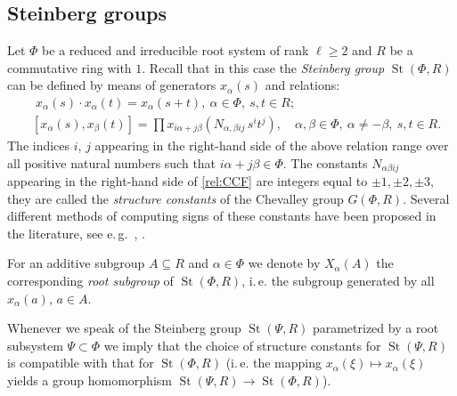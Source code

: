 \documentclass[oneside, 8pt]{amsart}
\theoremstyle{remark}
\theoremstyle{definition}
\numberwithin{lemma}{section}
\numberwithin{prop}{section}
\numberwithin{corollary}{section}
\numberwithin{externaltheorem}{section}
\DeclareMathOperator{\St}{St}
\numberwithin{equation}{section}
\begin{document}
\subsection{Steinberg groups} \label{sec:Steinberg-intro}
Let $\Phi$ be a reduced and irreducible root system of rank $\ell \geq 2$ and $R$ be a commutative ring with $1$. Recall that in this case the \emph{Steinberg group} $\St(\Phi, R)$ can be defined by means of generators $x_{\alpha}(s)$ and relations:
\begin{align}
& \phantom{[}
x_\alpha(s) \cdot x_\alpha(t) = x_\alpha(s+t),\ \alpha\in\Phi,\ s,t\in R; \label{rel:add}\\
& [x_\alpha(s), x_\beta(t)] = \prod
 x_{i\alpha + j\beta}\left(N_{\alpha,\beta ij}\, s^i t^j\right),\quad \alpha,\beta\in\Phi,\ \alpha\neq-\beta,\ s,t\in R. \label{rel:CCF}
\end{align}
The indices $i$, $j$ appearing in the right-hand side of the above relation range over
all positive natural numbers such that $i\alpha + j\beta\in\Phi$.
The constants $N_{\alpha \beta i j}$ appearing in the right-hand side of \eqref{rel:CCF} are integers equal to $\pm 1,\pm 2,\pm 3$, they are called the {\it structure constants} of the Chevalley group $G(\Phi, R)$. Several different methods of computing signs of these constants have been proposed in the literature, see e.\,g.~\cite{V00}, \cite[\S~9]{VP}. 

For an additive subgroup $A\subseteq R$ and $\alpha \in \Phi$ we denote by $X_\alpha(A)$ the corresponding {\it root subgroup} of $\St(\Phi, R)$, i.\,e. the subgroup generated by all $x_\alpha(a)$, $a \in A$.

Whenever we speak of the Steinberg group $\St(\Psi, R)$ parametrized by a root subsystem $\Psi \subset \Phi$ we imply that the choice of structure constants 
 for $\St(\Psi, R)$ is compatible with that for $\St(\Phi, R)$ (i.\,e. the mapping $x_\alpha(\xi) \mapsto x_\alpha(\xi)$ yields a group homomorphism $\St(\Psi, R) \to \St(\Phi, R)$).
\end{document}
